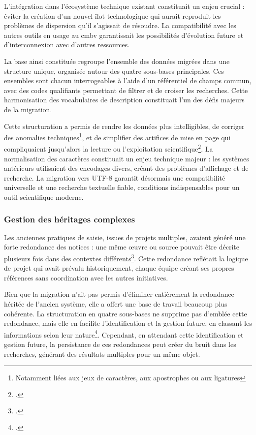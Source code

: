 L'intégration dans l'écosystème technique existant constituait un enjeu crucial : éviter la création d'un nouvel îlot technologique qui aurait reproduit les problèmes de dispersion qu'il s'agissait de résoudre. La compatibilité avec les autres outils en usage au \gls{cmbv} garantissait les possibilités d'évolution future et d'interconnexion avec d'autres ressources.

La base ainsi constituée regroupe l'ensemble des données migrées dans une structure unique, organisée autour des quatre sous-bases principales. Ces ensembles sont chacun interrogeables à l'aide d'un référentiel de champs commun, avec des codes qualifiants permettant de filtrer et de croiser les recherches. Cette harmonisation des vocabulaires de description constituait l'un des défis majeurs de la migration.

Cette structuration a permis de rendre les données plus intelligibles, de corriger des anomalies techniques\footnote{Notamment liées aux jeux de caractères, aux apostrophes ou aux ligatures}, et de simplifier des artifices de mise en page qui compliquaient jusqu'alors la lecture ou l'exploitation scientifique\footcite{laurentguilloRapportMigrationAnciennes2022}. La normalisation des caractères constituait un enjeu technique majeur : les systèmes antérieurs utilisaient des encodages divers, créant des problèmes d'affichage et de recherche. La migration vers UTF-8 garantit désormais une compatibilité universelle et une recherche textuelle fiable, conditions indispensables pour un outil scientifique moderne.

\subsubsection{Gestion des héritages complexes}

Les anciennes pratiques de saisie, issues de projets multiples, avaient généré une forte redondance des notices : une même œuvre ou source pouvait être décrite plusieurs fois dans des contextes différents\footcite{laurentguilloRapportMigrationAnciennes2022}. Cette redondance reflétait la logique de projet qui avait prévalu historiquement, chaque équipe créant ses propres références sans coordination avec les autres initiatives.

Bien que la migration n'ait pas permis d'éliminer entièrement la redondance héritée de l'ancien système, elle a offert une base de travail beaucoup plus cohérente. La structuration en quatre sous-bases ne supprime pas d'emblée cette redondance, mais elle en facilite l'identification et la gestion future, en classant les informations selon leur nature\footcite{laurentguilloRapportMigrationAnciennes2022}. Cependant, en attendant cette identification et gestion future, la persistance de ces redondances peut créer du bruit dans les recherches, générant des résultats multiples pour un même objet.

